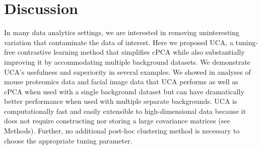 \documentclass[12pt]{article}
\begin{document}
\section{Discussion}
In many data analytics settings, we are interested in removing uninteresting variation that contaminate the data of interest.
Here we proposed UCA, a tuning-free contrastive learning method that simplifies cPCA while also substantially improving it by accommodating multiple background datasets. We demonstrate UCA's usefulness and superiority in several examples. %
We showed in analyses of mouse proteomics data and facial image data that UCA performs as well as cPCA when used with a single background dataset but can have dramatically better performance when used with multiple separate backgrounds.%
UCA is computationally fast and easily extensible to high-dimensional data because it does not require constructing nor storing a large covariance matrices (see Methods). Further, no additional post-hoc clustering method is necessary to choose the appropriate tuning parameter.
\end{document}

